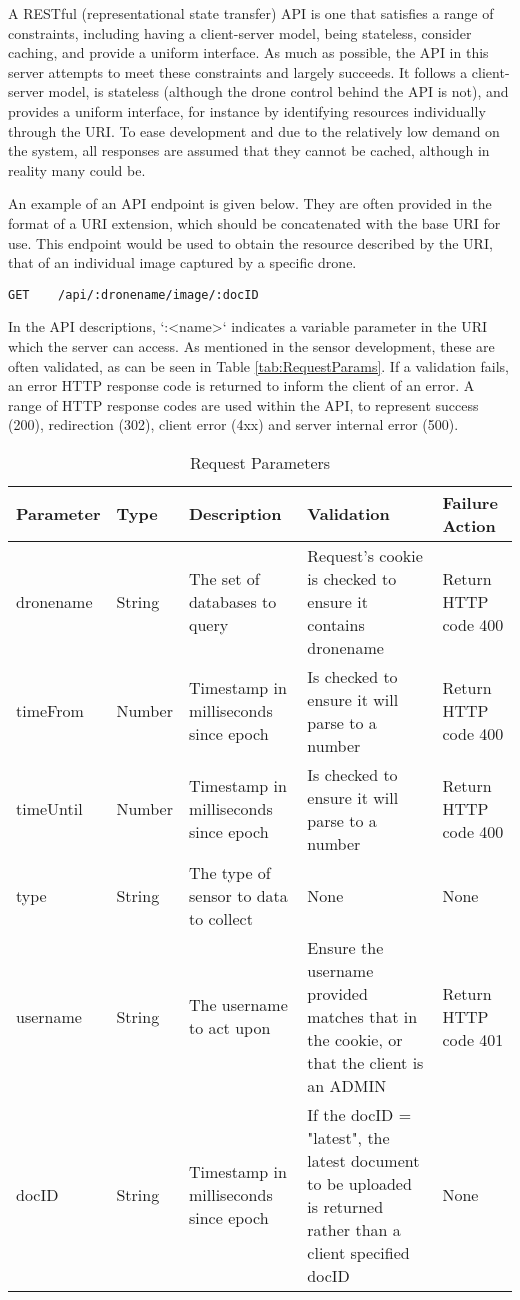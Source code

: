 \documentclass{article}
\begin{document}
A RESTful (representational state transfer) API is one that satisfies a range of constraints, including having a client-server model, being stateless, consider caching, and provide a uniform interface. As much as possible, the API in this server attempts to meet these constraints and largely succeeds. It follows a client-server model, is stateless (although the drone control behind the API is not), and provides a uniform interface, for instance by identifying resources individually through the URI. To ease development and due to the relatively low demand on the system, all responses are assumed that they cannot be cached, although in reality many could be. 

An example of an API endpoint is given below. They are often provided in the format of a URI extension, which should be concatenated with the base URI for use. This endpoint would be used to obtain the resource described by the URI, that of an individual image captured by a specific drone.
\begin{lstlisting}
GET    /api/:dronename/image/:docID
\end{lstlisting}
In the API descriptions, `:\textless name\textgreater` indicates a variable parameter in the URI which the server can access\cite{expressDocs}. As mentioned in the sensor development, these are often validated, as can be seen in Table \ref{tab:RequestParams}. If a validation fails, an error HTTP response code is returned to inform the client of an error. A range of HTTP response codes are used within the API, to represent success (200), redirection (302), client error (4xx) and server internal error (500).

\begin{table}[ht]
\caption{Request Parameters\label{tab:RequestParams}}
\centering
\renewcommand{\arraystretch}{1.5}
\begin{tabularx}{\textwidth}{>{\centering}p{1.5cm} >{\centering}p{1cm} >{\centering}p{3cm} p{5cm} X}
Parameter & Type & Description & Validation & Failure Action \\ [0.5ex]
\hline
dronename & String & The set of databases to query & Request's cookie is checked to ensure it contains dronename & Return HTTP code 400 \\
timeFrom  & Number & Timestamp in milliseconds since epoch  & Is checked to ensure it will parse to a number & Return HTTP code 400 \\
timeUntil & Number & Timestamp in milliseconds since epoch  & Is checked to ensure it will parse to a number & Return HTTP code 400 \\
type      & String & The type of sensor to data to collect & None & None \\
username  & String & The username to act upon & Ensure the username provided matches that in the cookie, or that the client is an ADMIN & Return HTTP code 401 \\ 
docID 	  & String & Timestamp in milliseconds since epoch & If the docID = "latest", the latest document to be uploaded is returned rather than a client specified docID & None \\ [1ex]
\hline
\end{tabularx}
\label{table:requestParams}
\end{table}
\end{document}
